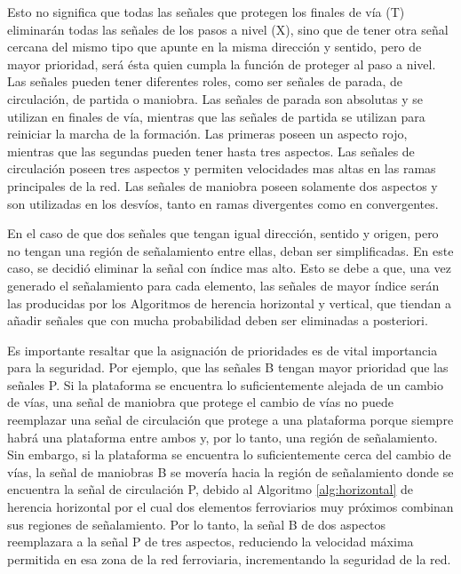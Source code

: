 	Esto no significa que todas las señales que protegen los finales de vía (T) eliminarán todas las señales de los pasos a nivel (X), sino que de tener otra señal cercana del mismo tipo que apunte en la misma dirección y sentido, pero de mayor prioridad, será ésta quien cumpla la función de proteger al paso a nivel. Las señales pueden tener diferentes roles, como ser señales de parada, de circulación, de partida o maniobra. Las señales de parada son absolutas y se utilizan en finales de vía, mientras que las señales de partida se utilizan para reiniciar la marcha de la formación. Las primeras poseen un aspecto rojo, mientras que las segundas pueden tener hasta tres aspectos. Las señales de circulación poseen tres aspectos y permiten velocidades mas altas en las ramas principales de la red. Las señales de maniobra poseen solamente dos aspectos y son utilizadas en los desvíos, tanto en ramas divergentes como en convergentes.
	
	En el caso de que dos señales que tengan igual dirección, sentido y origen, pero no tengan una región de señalamiento entre ellas, deban ser simplificadas. En este caso, se decidió eliminar la señal con índice mas alto. Esto se debe a que, una vez generado el señalamiento para cada elemento, las señales de mayor índice serán las producidas por los Algoritmos de herencia horizontal y vertical, que tiendan a añadir señales que con mucha probabilidad deben ser eliminadas a posteriori.
	
    Es importante resaltar que la asignación de prioridades es de vital importancia para la seguridad. Por ejemplo, que las señales B tengan mayor prioridad que las señales P. Si la plataforma se encuentra lo suficientemente alejada de un cambio de vías, una señal de maniobra que protege el cambio de vías no puede reemplazar una señal de circulación que protege a una plataforma porque siempre habrá una plataforma entre ambos y, por lo tanto, una región de señalamiento. Sin embargo, si la plataforma se encuentra lo suficientemente cerca del cambio de vías, la señal de maniobras B se movería hacia la región de señalamiento donde se encuentra la señal de circulación P, debido al Algoritmo \ref{alg:horizontal} de herencia horizontal por el cual dos elementos ferroviarios muy próximos combinan sus regiones de señalamiento. Por lo tanto, la señal B de dos aspectos reemplazara a la señal P de tres aspectos, reduciendo la velocidad máxima permitida en esa zona de la red ferroviaria, incrementando la seguridad de la red.	
